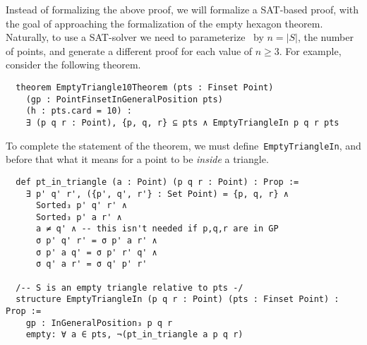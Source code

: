Instead of formalizing the above proof, we will formalize a SAT-based proof, with the goal of approaching the formalization of the empty hexagon theorem.
Naturally, to use a  SAT-solver we need to parameterize~ by $n = |S|$, the number of points, and generate a different proof for each value of $n \geq 3$. For example, consider the following theorem.

\begin{lstlisting}
  theorem EmptyTriangle10Theorem (pts : Finset Point)
    (gp : PointFinsetInGeneralPosition pts)
    (h : pts.card = 10) :
    ∃ (p q r : Point), {p, q, r} ⊆ pts ∧ EmptyTriangleIn p q r pts
\end{lstlisting}

To complete the statement of the theorem, we must define~\texttt{EmptyTriangleIn}, and before that what it means for a point to be \emph{inside} a triangle.

\begin{lstlisting}
  def pt_in_triangle (a : Point) (p q r : Point) : Prop :=
    ∃ p' q' r', ({p', q', r'} : Set Point) = {p, q, r} ∧
      Sorted₃ p' q' r' ∧
      Sorted₃ p' a r' ∧
      a ≠ q' ∧ -- this isn't needed if p,q,r are in GP
      σ p' q' r' = σ p' a r' ∧
      σ p' a q' = σ p' r' q' ∧
      σ q' a r' = σ q' p' r'

  /-- S is an empty triangle relative to pts -/
  structure EmptyTriangleIn (p q r : Point) (pts : Finset Point) : Prop :=
    gp : InGeneralPosition₃ p q r
    empty: ∀ a ∈ pts, ¬(pt_in_triangle a p q r)
\end{lstlisting}


